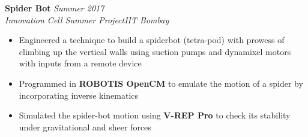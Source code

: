 \documentclass{article}
\begin{document}
\hspace{-15pt}\textbf{Spider Bot} \hfill{\sl \small Summer 2017}\\
\textit{Innovation Cell Summer Project}\hfill{\sl \small IIT Bombay}\\
\vspace{-15pt}
\begin{itemize}[itemsep = -0.75 mm, leftmargin=*]
\item Engineered a technique to build a spiderbot (tetra-pod) with prowess of climbing up the vertical walls using suction pumps and dynamixel motors with inputs from a remote device
\item Programmed in \textbf{ROBOTIS OpenCM} to emulate the motion of a spider by incorporating inverse kinematics
\item Simulated the spider-bot motion using \textbf{V-REP Pro} to check its stability under gravitational and sheer forces
\end{itemize}
\end{document}
